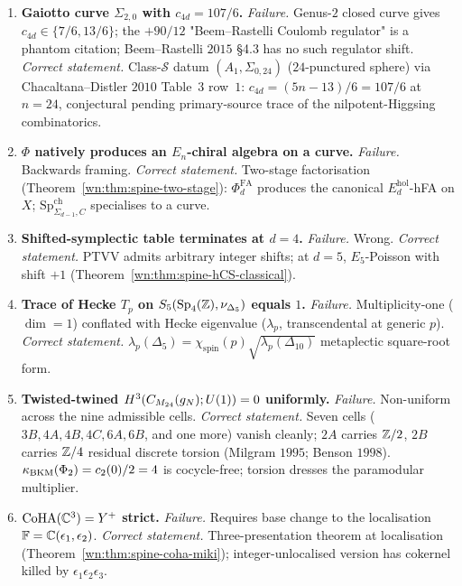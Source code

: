 \begin{theorem}
\begin{enumerate}
\item \textbf{Gaiotto curve $\Sigma_{2,0}$ with $c_{4d} = 107/6$.}
\emph{Failure.} Genus-$2$ closed curve gives $c_{4d} \in \{7/6, 13/6\}$;
the $+90/12$ "Beem--Rastelli Coulomb regulator" is a phantom citation;
Beem--Rastelli $2015$ \S 4.3 has no such regulator shift.
\emph{Correct statement.} Class-$\mathcal{S}$ datum $(A_1, \Sigma_{0,24})$
($24$-punctured sphere) via Chacaltana--Distler $2010$ Table~$3$
row~$1$: $c_{4d} = (5n - 13)/6 = 107/6$ at $n = 24$, conjectural
pending primary-source trace of the nilpotent-Higgsing combinatorics.

\item \textbf{$\Phi$ natively produces an $E_n$-chiral algebra on a
curve.}
\emph{Failure.} Backwards framing.
\emph{Correct statement.} Two-stage factorisation
(Theorem~\ref{wn:thm:spine-two-stage}): $\Phi^{\mathrm{FA}}_d$
produces the canonical $E_d^{\mathrm{hol}}$-hFA on $X$;
$\mathrm{Sp}^{\mathrm{ch}}_{\Sigma_{d-1}, C}$ specialises to a
curve.

\item \textbf{Shifted-symplectic table terminates at $d = 4$.}
\emph{Failure.} Wrong.
\emph{Correct statement.} PTVV admits arbitrary integer shifts; at $d = 5$,
$E_5$-Poisson with shift $+1$
(Theorem~\ref{wn:thm:spine-hCS-classical}).

\item \textbf{Trace of Hecke $T_p$ on $S_5(\mathrm{Sp}_4(\mathbb{Z}),
\nu_{\Delta_5})$ equals $1$.}
\emph{Failure.} Multiplicity-one ($\dim = 1$) conflated with Hecke
eigenvalue ($\lambda_p$, transcendental at generic $p$).
\emph{Correct statement.} $\lambda_p(\Delta_5) = \chi_{\mathrm{spin}}(p)
\sqrt{\lambda_p(\Delta_{10})}$ metaplectic square-root form.

\item \textbf{Twisted-twined $H^3(C_{M_{24}}(g_N); U(1)) = 0$ uniformly.}
\emph{Failure.} Non-uniform across the nine admissible cells.
\emph{Correct statement.} Seven cells ($3B, 4A, 4B, 4C, 6A, 6B$, and one more)
vanish cleanly; $2A$ carries $\mathbb{Z}/2$, $2B$ carries $\mathbb{Z}/4$ residual
discrete torsion (Milgram $1995$; Benson $1998$). $\kappa_{\mathrm{BKM}}(\Phi_2) =
c_2(0)/2 = 4$ is cocycle-free; torsion dresses the paramodular
multiplier.

\item \textbf{$\mathrm{CoHA}(\mathbb{C}^3) = Y^+$ strict.}
\emph{Failure.} Requires base change to the localisation
$\mathbb{F} = \mathbb{C}(\epsilon_1, \epsilon_2)$.
\emph{Correct statement.} Three-presentation theorem at localisation
(Theorem~\ref{wn:thm:spine-coha-miki}); integer-unlocalised version
has cokernel killed by $\epsilon_1\epsilon_2\epsilon_3$.


\end{enumerate}
\end{theorem}
